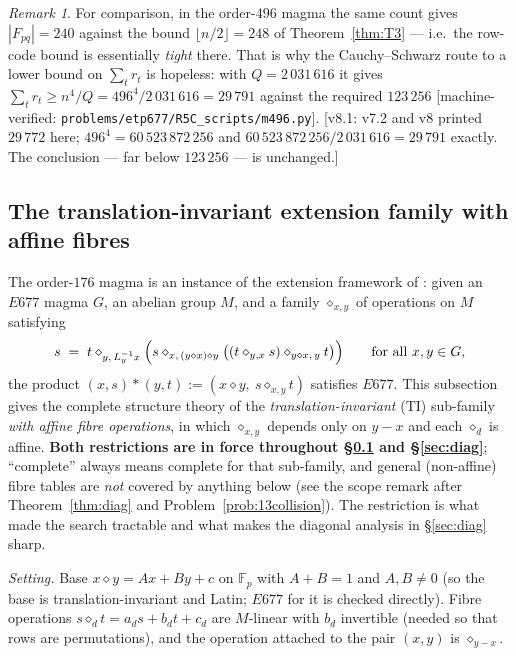 \documentclass[11pt]{article}
\theoremstyle{plain}
\theoremstyle{definition}
\theoremstyle{remark}
\newtheorem*{remark*}{Remark}
\numberwithin{equation}{section}
\newcommand{\F}{\mathbb{F}}
\newcommand{\op}{\mathbin{*}}
\newcommand{\statusbox}[1]{{\small\sloppy\textsf{[#1]}}}
\newcommand{\MV}[1]{\statusbox{machine-verified: \texttt{#1}}}
\begin{document}
\begin{remark*}
For comparison, in the order-$496$ magma the same count gives $|F_{pq}| = 240$ against the
bound $\lfloor n/2\rfloor = 248$ of Theorem~\ref{thm:T3} --- i.e.\ the row-code bound is
essentially \emph{tight} there. That is why the Cauchy--Schwarz route to a lower bound on
$\sum_t r_t$ is hopeless: with $Q = 2\,031\,616$ it gives
$\sum_t r_t \ge n^4/Q = 496^4/2\,031\,616 = 29\,791$ against the required
$123\,256$ \MV{problems\slash etp677\slash R5C\_scripts\slash m496.py}.
[v8.1: v7.2 and v8 printed $29\,772$ here; $496^4 = 60\,523\,872\,256$ and
$60\,523\,872\,256/2\,031\,616 = 29\,791$ exactly. The conclusion --- far below
$123\,256$ --- is unchanged.]
\end{remark*}

\subsection{The translation-invariant extension family with affine fibres}\label{sec:TIfamily}

The order-$176$ magma is an instance of the extension framework of
\cite[Ch.~13]{blueprint}: given an $E677$ magma $G$, an abelian group $M$, and a family
$\diamond_{x,y}$ of operations on $M$ satisfying
\begin{equation}\label{eq:bp4}
  s \;=\; t \diamond_{y,\,L_y^{-1}x}\Bigl( s \diamond_{x,\,(y\diamond x)\diamond y}
          \bigl( (t\diamond_{y,x}s)\diamond_{y\diamond x,\,y} t \bigr)\Bigr)
  \qquad \text{for all } x,y\in G,
\end{equation}
the product $(x,s)\op(y,t) := (x\diamond y,\ s\diamond_{x,y}t)$ satisfies $E677$. This
subsection gives the complete structure theory of the \emph{translation-invariant} (TI)
sub-family \emph{with affine fibre operations}, in which $\diamond_{x,y}$ depends only on
$y-x$ and each $\diamond_d$ is affine. \textbf{Both restrictions are in force throughout
\S\ref{sec:TIfamily} and \S\ref{sec:diag}}; ``complete'' always means complete for that
sub-family, and general (non-affine) fibre tables are \emph{not} covered by anything below
(see the scope remark after Theorem~\ref{thm:diag} and
Problem~\ref{prob:13collision}). The restriction is what made the search
tractable and what makes the diagonal analysis in \S\ref{sec:diag} sharp.

\emph{Setting.} Base $x\diamond y = Ax+By+c$ on $\F_p$ with $A+B=1$ and $A,B\ne 0$ (so the
base is translation-invariant and Latin; $E677$ for it is checked directly). Fibre operations
$s\diamond_d t = a_d s + b_d t + c_d$ are $M$-linear with $b_d$ invertible (needed so that
rows are permutations), and the operation attached to the pair $(x,y)$ is $\diamond_{y-x}$.
\end{document}
